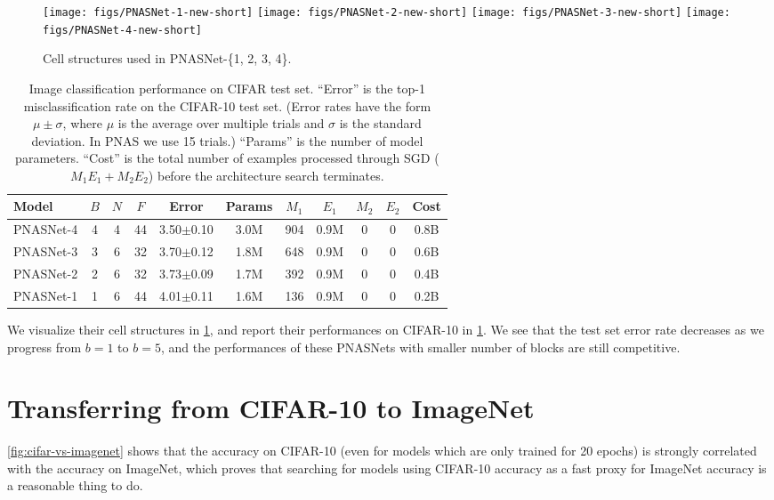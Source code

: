 \documentclass[runningheads]{llncs}
\begin{document}
\begin{figure}[h]
\centering
\texttt{[image: figs/PNASNet-1-new-short]}
\texttt{[image: figs/PNASNet-2-new-short]}
\texttt{[image: figs/PNASNet-3-new-short]}
\texttt{[image: figs/PNASNet-4-new-short]}
\caption{Cell structures used in PNASNet-\{1, 2, 3, 4\}.}
\label{fig:pnasnets}
\end{figure}\begin{table}[h!]
\begin{center}
\begin{tabular}{l c c c|c c|c c c c c}
\toprule
Model & $B$ & $N$ & $F$ & Error & Params & $M_1$ & $E_1$ & $M_2$ & $E_2$ & Cost
\\
\midrule
PNASNet-4 & 4 & 4 & 44 &  3.50$\pm$0.10 & 3.0M & 904 & 0.9M & 0 & 0 & 0.8B \\
PNASNet-3 & 3 & 6 & 32  & 3.70$\pm$0.12 & 1.8M & 648 & 0.9M & 0 & 0 & 0.6B \\
PNASNet-2 & 2 & 6 & 32 & 3.73$\pm$0.09 & 1.7M & 392 & 0.9M & 0 & 0 & 0.4B \\
PNASNet-1 & 1 & 6 & 44  & 4.01$\pm$0.11 & 1.6M & 136 & 0.9M & 0 & 0 & 0.2B \\
\bottomrule
\end{tabular}
\end{center}
\caption{Image classification performance on CIFAR test set.
``Error'' is the top-1 misclassification rate on the CIFAR-10 test set.
(Error rates have the form $\mu \pm \sigma$,
where $\mu$ is the average over multiple trials and $\sigma$ is the standard deviation. In PNAS we use 15 trials.)
``Params'' is the  number of model parameters.
``Cost'' is the total number of examples processed through SGD ($M_1 E_1 + M_2 E_2$) before the architecture search terminates.}
\label{tab:cifar}
\end{table}

We visualize their cell structures in \cref{fig:pnasnets}, and report their performances on CIFAR-10 in \cref{tab:cifar}.
We see that the test set error rate decreases as we progress from $b=1$ to $b=5$, and the performances of these PNASNets with smaller number of blocks are still competitive.

\section{Transferring from CIFAR-10 to ImageNet}\cref{fig:cifar-vs-imagenet} shows that the accuracy on CIFAR-10 (even for models which are only trained for 20 epochs) is strongly correlated with the accuracy on ImageNet, which proves that searching for models using CIFAR-10 accuracy as a fast proxy for ImageNet accuracy is a reasonable thing to do.
\end{document}
